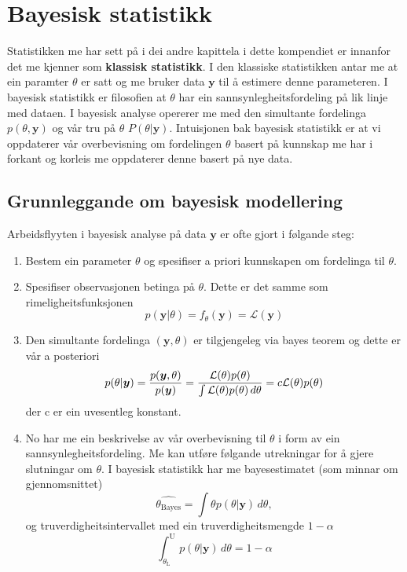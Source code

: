 \chapter{Bayesisk statistikk}

Statistikken me har sett på i dei andre kapittela i dette kompendiet er innanfor det me kjenner som \textbf{klassisk statistikk}. I den klassiske statistikken antar me at ein paramter $\theta$ er satt og me bruker data $\boldsymbol{y}$ til å estimere denne parameteren. I bayesisk statistikk er filosofien at $\theta$ har ein sannsynlegheitsfordeling på lik linje med dataen. I bayesisk analyse opererer me med den simultante fordelinga $p(\theta, \boldsymbol{y})$ og vår tru på $\theta$ $P(\theta | \boldsymbol{y})$. Intuisjonen bak bayesisk statistikk er at vi oppdaterer vår overbevisning om fordelingen $\theta$ basert på kunnskap me har i forkant og korleis me oppdaterer denne basert på nye data.

\section{Grunnleggande om bayesisk modellering}
Arbeidsflyyten i bayesisk analyse på data $\boldsymbol{y}$ er ofte gjort i følgande steg:

\begin{enumerate}

    \item Bestem ein parameter $\theta$ og spesifiser a priori kunnskapen om fordelinga til $\theta$.
    \item Spesifiser observasjonen betinga på $\theta$. Dette er det samme som rimeligheitsfunksjonen 
    \begin{equation}
        p(\boldsymbol{y} | \theta) = f_\theta(\boldsymbol{y}) = \mathcal{L}(\boldsymbol{y}) 
    \end{equation}
    \item Den simultante fordelinga $(\boldsymbol{y}, \theta)$ er tilgjengeleg via bayes teorem og dette er vår a posteriori
    \begin{equation}
        p(\theta|\boldsymbol{y}) = \frac{p(\boldsymbol{y}, \theta)}{p(\boldsymbol{y})} = \\
        \frac{\mathcal{L}(\theta)p(\theta)}{\int\mathcal{L}(\theta)p(\theta) \,d\theta} = c\mathcal{L}(\theta)p(\theta)
    \end{equation}
    der c er ein uvesentleg konstant.
    \item No har me ein beskrivelse av vår overbevisning til $\theta$ i form av ein sannsynlegheitsfordeling. Me kan utføre følgande utrekningar for å gjere slutningar om $\theta$. I bayesisk statistikk har me bayesestimatet (som minnar om gjennomsnittet)
    \begin{equation}
        \hat{\theta_{\mathrm{Bayes}}} = \int \theta p(\theta | \boldsymbol{y}) \,d\theta,
    \end{equation}
    og truverdigheitsintervallet med ein truverdigheitsmengde $1 - \alpha$
    \begin{equation}
        \int_{\theta_\mathrm{L}}^{\mathrm{U}} p(\theta | \boldsymbol{y}) \,d\theta = 1 - \alpha
    \end{equation}
\end{enumerate}